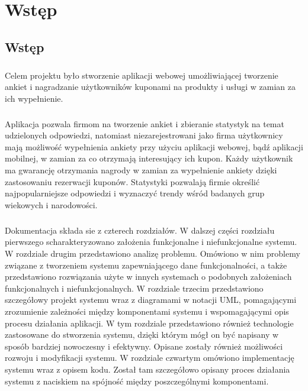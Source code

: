 \chapter{Wstęp}
\section{Wstęp}
\paragraph{}
Celem projektu było stworzenie aplikacji webowej umożliwiającej tworzenie ankiet i nagradzanie użytkowników kuponami na produkty i usługi w zamian za ich wypełnienie.
\paragraph{}
Aplikacja pozwala firmom na tworzenie ankiet i zbieranie statystyk na temat udzielonych odpowiedzi, natomiast niezarejestrowani jako firma użytkownicy mają możliwość wypełnienia ankiety przy użyciu aplikacji webowej, bądź aplikacji mobilnej, w zamian za co otrzymają interesujący ich kupon. Każdy użytkownik ma gwarancję otrzymania nagrody w zamian za wypełnienie ankiety dzięki zastosowaniu rezerwacji kuponów. Statystyki pozwalają firmie określić najpopularniejsze odpowiedzi i wyznaczyć trendy wśród badanych grup wiekowych i narodowości.

\paragraph{}
Dokumentacja składa sie z czterech rozdziałów. W dalszej części rozdziału pierwszego scharakteryzowano założenia funkcjonalne i niefunkcjonalne systemu. W rozdziale drugim przedstawiono analizę problemu. Omówiono w nim problemy związane z tworzeniem systemu zapewniającego dane funkcjonalności, a także przedstawiono rozwiązania użyte w innych systemach o podobnych założeniach funkcjonalnych i niefunkcjonalnych. W rozdziale trzecim przedstawiono szczegółowy projekt systemu wraz z diagramami w notacji UML, pomagającymi zrozumienie zależności między komponentami systemu i wspomagającymi opis procesu działania aplikacji. W tym rozdziale przedstawiono również technologie zastosowane do stworzenia systemu, dzięki którym mógł on być napisany w sposób bardziej nowoczesny i efektywny. Opisane zostały również możliwości rozwoju i modyfikacji systemu. W rozdziale czwartym omówiono implementację systemu wraz z opisem kodu. Został tam szczegółowo opisany proces działania systemu z naciskiem na spójność między poszczególnymi komponentami.


